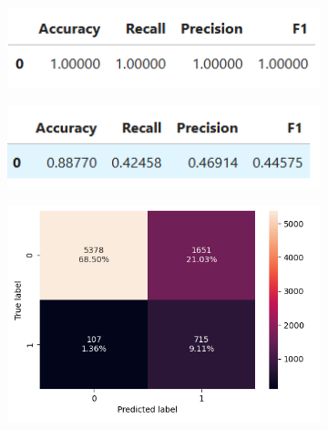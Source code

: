 \documentclass[12pt,a4paper]{article}
\begin{document}
	\begin{figure}[h]
		\centering
		\begin{subfigure}[t]{0.49\textwidth}
			\includegraphics[width=\textwidth]{dTree_base_train_perf.png}
			\caption{}
			\label{fig:dTree_base_train_perf}
		\end{subfigure}
		\hfill
		\begin{subfigure}[t]{0.49\textwidth}
			\includegraphics[width=\textwidth]{dTree_base_test_perf.png}
			\caption{}
			\label{fig:Tree_base_test_per}
		\end{subfigure}
		\begin{subfigure}[t]{0.47\textwidth}
			\includegraphics[width=\textwidth]{dTree_c_Matrix_train.png}
			\caption{}
			\label{fig:dTree_base_c_Matrix_trai}
		\end{subfigure}
		\hfill
		\begin{subfigure}[t]{0.45\textwidth}

\end{subfigure}
\end{figure}
\end{document}
